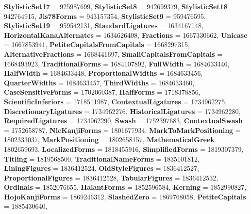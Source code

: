 \begin{DoxyCompactItemize}
{\bfseries Stylistic\+Set17} = 925987699, 
{\bfseries Stylistic\+Set8} = 942699379, 
\newline
{\bfseries Stylistic\+Set18} = 942764915, 
{\bfseries Jis78\+Forms} = 943157354, 
{\bfseries Stylistic\+Set9} = 959476595, 
{\bfseries Stylistic\+Set19} = 959542131, 
\newline
{\bfseries Standard\+Ligatures} = 1634167148, 
{\bfseries Horizontal\+Kana\+Alternates} = 1634626408, 
{\bfseries Fractions} = 1667330662, 
{\bfseries Unicase} = 1667853941, 
\newline
{\bfseries Petite\+Capitals\+From\+Capitals} = 1668297315, 
{\bfseries Alternative\+Fractions} = 1668441697, 
{\bfseries Small\+Capitals\+From\+Capitals} = 1668493923, 
{\bfseries Traditional\+Forms} = 1684107892, 
\newline
{\bfseries Full\+Width} = 1684633446, 
{\bfseries Half\+Width} = 1684633448, 
{\bfseries Proportional\+Widths} = 1684633456, 
{\bfseries Quarter\+Widths} = 1684633457, 
\newline
{\bfseries Third\+Widths} = 1684633460, 
{\bfseries Case\+Sensitive\+Forms} = 1702060387, 
{\bfseries Half\+Forms} = 1718378856, 
{\bfseries Scientific\+Inferiors} = 1718511987, 
\newline
{\bfseries Contextual\+Ligatures} = 1734962275, 
{\bfseries Discretionary\+Ligatures} = 1734962276, 
{\bfseries Historical\+Ligatures} = 1734962280, 
{\bfseries Required\+Ligatures} = 1734962290, 
\newline
{\bfseries Swash} = 1752397683, 
{\bfseries Contextual\+Swash} = 1752658787, 
{\bfseries Nlc\+Kanji\+Forms} = 1801677934, 
{\bfseries Mark\+To\+Mark\+Positioning} = 1802333037, 
\newline
{\bfseries Mark\+Positioning} = 1802658157, 
{\bfseries Mathematical\+Greek} = 1802659693, 
{\bfseries Localized\+Forms} = 1818455916, 
{\bfseries Simplified\+Forms} = 1819307379, 
\newline
{\bfseries Titling} = 1819568500, 
{\bfseries Traditional\+Name\+Forms} = 1835101812, 
{\bfseries Lining\+Figures} = 1836412524, 
{\bfseries Old\+Style\+Figures} = 1836412527, 
\newline
{\bfseries Proportional\+Figures} = 1836412528, 
{\bfseries Tabular\+Figures} = 1836412532, 
{\bfseries Ordinals} = 1852076655, 
{\bfseries Halant\+Forms} = 1852596584, 
\newline
{\bfseries Kerning} = 1852990827, 
{\bfseries Hojo\+Kanji\+Forms} = 1869246312, 
{\bfseries Slashed\+Zero} = 1869768058, 
{\bfseries Petite\+Capitals} = 1885430640, 
\newline

\end{DoxyCompactItemize}
